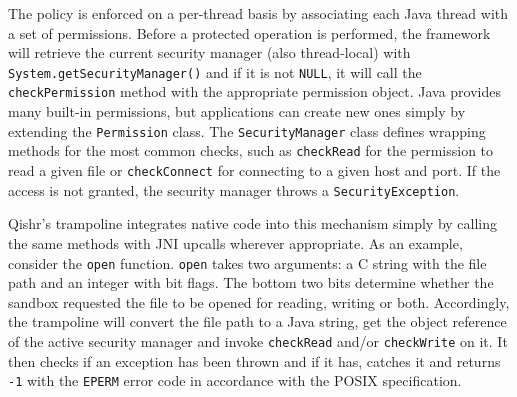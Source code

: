 \documentclass[a4paper,12pt,twoside,openright]{report}
\newcommand{\class}[1]{\texttt{#1}}
\begin{document}
The policy is enforced on a per-thread basis by associating each Java thread with a set of permissions. Before a protected operation is performed, the framework will retrieve the current security manager (also thread-local) with \texttt{System.{\allowbreak}getSecurityManager()} and if it is not \texttt{NULL}, it will call the \texttt{checkPermission} method with the appropriate permission object. Java provides many built-in permissions, but applications can create new ones simply by extending the \class{Permission} class. The \class{Security\-Manager} class defines wrapping methods for the most common checks, such as \texttt{checkRead} for the permission to read a given file or \texttt{checkConnect} for connecting to a given host and port. If the access is not granted, the security manager throws a \texttt{SecurityException}.

Qishr's trampoline integrates native code into this mechanism simply by calling the same methods with JNI upcalls wherever appropriate. As an example, consider the \texttt{open} function. \texttt{open} takes two arguments: a C string with the file path and an integer with bit flags. The bottom two bits determine whether the sandbox requested the file to be opened for reading, writing or both. Accordingly, the trampoline will convert the file path to a Java string, get the object reference of the active security manager and invoke \texttt{checkRead} and/or \texttt{checkWrite} on it. It then checks if an exception has been thrown and if it has, catches it and returns \texttt{-1} with the \texttt{EPERM} error code in accordance with the POSIX specification. \label{sec:SyscallException}
\end{document}
